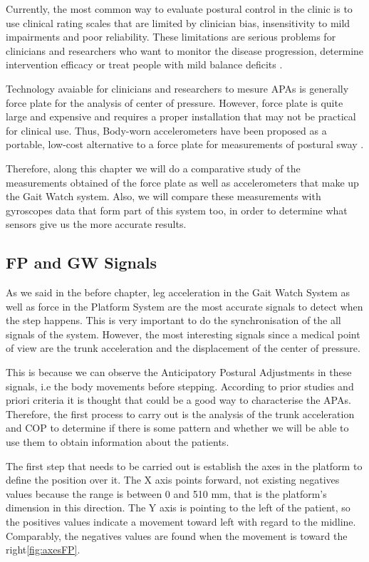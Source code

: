 Currently, the most common way to evaluate postural control in the clinic is to use clinical rating scales that are limited by clinician bias, insensitivity to mild impairments and poor reliability. These limitations are serious problems for clinicians and researchers who want to monitor the disease progression, determine intervention efficacy or treat people with mild balance deficits \cite{Mancini2012} .

Technology avaiable for clinicians and researchers to mesure APAs is generally force plate for the analysis of center of pressure. However, force plate is quite large and expensive and requires a proper installation that may not be practical for clinical use. Thus, Body-worn accelerometers have been proposed as a portable, low-cost alternative to a force plate for measurements of postural sway\cite{Mancini2012} .
 
Therefore, along this chapter we will do a comparative study of the measurements obtained of the force plate as well as accelerometers that make up the Gait Watch system. Also, we will compare these measurements with gyroscopes data that form part of this system too, in order to determine what sensors give us the more accurate results.

\subsection{FP and GW Signals}
As we said in the before chapter, leg acceleration in the Gait Watch System as well as force in the Platform System are the most accurate signals to detect when the step happens. This is very important to do the synchronisation of the all signals of the system. However, the most interesting signals since a medical point of view are the trunk acceleration and the displacement of the center of pressure.

This is because we can observe the Anticipatory Postural Adjustments in these signals, i.e the body movements before stepping. According to prior studies and priori criteria it is thought that could be a good way to characterise the APAs.
Therefore, the first process to carry out is the analysis of the trunk acceleration and COP to determine if there is some pattern and whether we will be able to use them to obtain information about the patients.

The first step that needs to be carried out is establish the axes in the platform to define the position over it. The X axis points forward, not existing negatives values because the range is between 0 and 510 mm, that is the platform’s dimension in this direction. The Y axis is pointing to the left of the patient, so the positives values indicate a movement toward left with regard to the midline. Comparably, the negatives values are found when the movement is toward the right\ref{fig:axesFP}.

